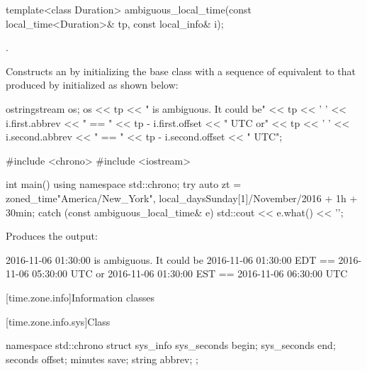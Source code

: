 %
\begin{itemdecl}
template<class Duration>
  ambiguous_local_time(const local_time<Duration>& tp, const local_info& i);
\end{itemdecl}

\begin{itemdescr}
\pnum
\requires {}.

\pnum
\effects
Constructs an 
by initializing the base class with a sequence of 
equivalent to that produced by 
initialized as shown below:

\begin{codeblock}
ostringstream os;
os << tp << " is ambiguous.  It could be\n"
   << tp << ' ' << i.first.abbrev << " == "
   << tp - i.first.offset << " UTC or\n"
   << tp << ' ' << i.second.abbrev  << " == "
   << tp - i.second.offset  << " UTC";
\end{codeblock}

\pnum
\begin{example}
\begin{codeblock}
#include <chrono>
#include <iostream>

int main() {
  using namespace std::chrono;
  try {
    auto zt = zoned_time{"America/New_York",
                         local_days{Sunday[1]/November/2016} + 1h + 30min};
  } catch (const ambiguous_local_time& e) {
    std::cout << e.what() << '\n';
  }
}
\end{codeblock}

Produces the output:

\begin{outputblock}
2016-11-06 01:30:00 is ambiguous.  It could be
2016-11-06 01:30:00 EDT == 2016-11-06 05:30:00 UTC or
2016-11-06 01:30:00 EST == 2016-11-06 06:30:00 UTC
\end{outputblock}
\end{example}
\end{itemdescr}

[time.zone.info]{Information classes}

[time.zone.info.sys]{Class }

\begin{codeblock}
namespace std::chrono {
  struct sys_info {
    sys_seconds   begin;
    sys_seconds   end;
    seconds       offset;
    minutes       save;
    string        abbrev;
  };
}
\end{codeblock}

